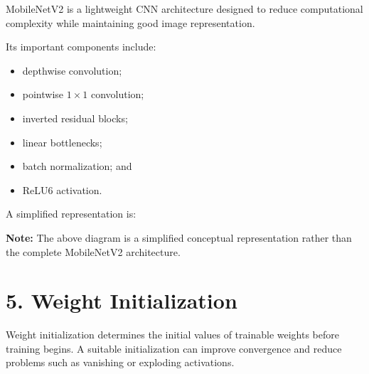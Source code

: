 \documentclass[10pt]{article}
\begin{document}
MobileNetV2 is a lightweight CNN architecture designed to reduce
computational complexity while maintaining good image representation.

Its important components include:

\begin{itemize}
\item depthwise convolution;
\item pointwise $1\times1$ convolution;
\item inverted residual blocks;
\item linear bottlenecks;
\item batch normalization; and
\item ReLU6 activation.
\end{itemize}

A simplified representation is:

\begin{center}
\end{center}

\textbf{Note:} The above diagram is a simplified conceptual representation
rather than the complete MobileNetV2 architecture.

\section*{5. Weight Initialization}

Weight initialization determines the initial values of trainable weights
before training begins. A suitable initialization can improve convergence
and reduce problems such as vanishing or exploding activations.
\end{document}
